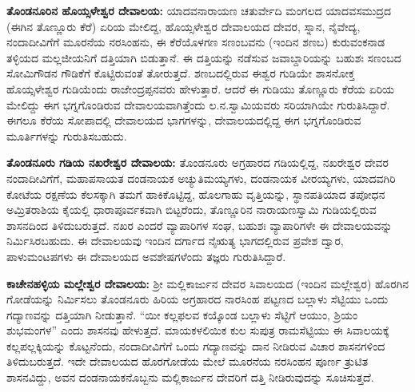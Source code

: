 \textbf{ತೊಂಡನೂರಿನ ಹೊಯ್ಸಳೇಶ್ವರ ದೇವಾಲಯ:} ಯಾದವನಾರಾಯಣ ಚತುರ್ವೇದಿ ಮಂಗಲದ ಯಾದವಸಮುದ್ರದ (ಈಗಿನ ತೊಣ್ಣೂರು ಕೆರೆ) ಏರಿಯ ಮೇಲಿದ್ದ, ಹೊಯ್ಸಳೇಶ್ವರ ದೇವಾಲಯದ ದೇವರ, ಸ್ನಾನ, ನೈವೇದ್ಯ, ನಂದಾದೀವಿಗೆಗೆ ಮೂರನೆಯ ನರಸಿಂಹನು, ಈ ಕೆರೆಯೊಳಗಣ ಸಣಂಬವನು (ಇಂದಿನ ಶಣಬ) ಕುರುವಂಕನಾಡ ತಳ್ಳಿಯದ ಮಲ್ಲಜೀಯನಿಗೆ ದತ್ತಿಯಾಗಿ ಬಿಡುತ್ತಾನೆ. ಈ ದತ್ತಿಯನ್ನು ನಡೆಸುವ ಜವಾಬ್ದಾರಿಯನ್ನು ಬಹುಶಃ ಸಣಂಬದ ಸೋಮಿಗೌಡನ ಗೌಡಿಕೆಗೆ ಕೊಟ್ಟಿರುವಂತೆ ತೋರುತ್ತದೆ. ಶಣಬದಲ್ಲಿರುವ ಈಶ್ವರ ಗುಡಿಯೇ ಶಾಸನೋಕ್ತ ಹೊಯ್ಸಳೇಶ್ವರ ಗುಡಿಯೆಂದು ರಾಜೇಂದ್ರಪ್ಪನವರು ಹೇಳುತ್ತಾರೆ. ಆದರೆ ಈ ಗುಡಿಯು ತೊಣ್ಣೂರು ಕೆರೆಯ ಏರಿಯ ಮೇಲಿದ್ದು ಈಗ ಭಗ್ನಗೊಂಡಿರುವ ದೇವಾಲಯವಾಗಿತ್ತೆಂದು ಲ.ನ.ಸ್ವಾಮಿಯವರು ಸರಿಯಾಗಿಯೇ ಗುರುತಿಸಿದ್ದಾರೆ. ಈಗಲೂ ಕೆರೆಯ ಸೋಪಾದಲ್ಲಿ ದೇವಾಲಯದ ಭಾಗಗಳನ್ನು, ದೇವಾಲಯದಲ್ಲಿದ್ದ ಈಗ ಭಗ್ನಗೊಂಡಿರುವ ಮೂರ್ತಿಗಳನ್ನು ಗುರುತಿಸಬಹುದು.

\textbf{ತೊಂಡನೂರು ಗಡಿಯ ನಖರೇಶ್ವರ ದೇವಾಲಯ:} ತೊಂಡನೂರು ಅಗ್ರಹಾರದ ಗಡಿಯಲ್ಲಿದ್ದ, ನಖರೇಶ್ವರ ದೇವರ ನಂದಾದೀವಿಗೆಗೆ, ಮಹಾಪಸಾಯತ ದಂಡನಾಯಕ ಅಚ್ಯುತಿಮಯ್ಯಗಳು, ದಂಡನಾಯಕ ವೀರಯ್ಯಗಳು, ಯಾದವಗಿರಿ ಕೋಟೆಯ ರಕ್ಷಣೆಯ ಕೆಲಸಕ್ಕಾಗಿ ತಮಗೆ ಹಾಕಿಕೊಟ್ಟಿದ್ದ, ಹೊಲಗಾಹು ವೃತ್ತಿಯನ್ನು, ಸ್ಥಾನಪತಿಯಾದ ತಪೋಧನ ಅಮ್ರಿತರಾಶಿಯ ಕೈಯಲ್ಲಿ ಧಾರಾಪೂರ್ವಕವಾಗಿ ಬಿಟ್ಟರೆಂದು, ತೊಣ್ಣೂರಿನ ನಾರಾಯಣಸ್ವಾಮಿ ಗುಡಿಯಲ್ಲಿರುವ ಶಾಸನದಿಂದ ತಿಳಿದುಬರುತ್ತದೆ. ನಖರ ಎಂದರೆ ವ್ಯಾಪಾರಿಗಳ ಸಂಘ, ಬಹುಶಃ ವ್ಯಾಪಾರಿಗಳೇ ಈ ದೇವಾಲಯವನ್ನು ನಿರ್ಮಿಸಿರಬಹುದು. ಈ ದೇವಾಲಯವು ಇಂದಿನ ದರ್ಗಾದ ನೈಋತ್ಯ ಭಾಗದಲ್ಲಿರುವ ಪ್ರವೇಶ ದ್ವಾರ, ಪಾಳುಮಂಟಪಗಳು ಈ ದೇವಾಲಯದ ಅವಶೇಷಗಳೆಂದು ತಜ್ಞರು ಗುರುತಿಸಿದ್ದಾರೆ.

\textbf{ಕಾಚೇನಹಳ್ಳಿಯ ಮಲ್ಲೇಶ್ವರ ದೇವಾಲಯ:} ಶ‍್ರೀ ಮಲ್ಲಿಕಾರ್ಜುನ ದೇವರ ಸಿವಾಲಯದ (ಇಂದಿನ ಮಲ್ಲೇಶ್ವರ) ಹೊರಗಿನ ಗೋಡೆಯನ್ನು ನಿರ್ಮಿಸಲು ತೊಂಡನೂರು ಹಿರಿಯ ಅಗ್ರಹಾರದ ನಾರಸಿಂಹ ಪಟ್ಟಣದ ಬಲ್ಲಾಳು ಸೆಟ್ಟಿಯು ಒಂದು ಗದ್ಯಾಣವನ್ನು ದತ್ತಿಯಾಗಿ ನೀಡುತ್ತಾನೆ. “ಯೀ ಕಲ್ಲಫಲವ ಕಯ್ಕೊಂಡ ಬಲ್ಲಾಳು ಸೆಟ್ಟಿಗೆ ಆಯುಂ, ಶ್ರಿಯಂ ಶುಭಮಂಗಳ” ಎಂದು ಶಾಸನವು ಹೇಳುತ್ತದೆ. ಮಾಯಕಳಲಿಯಿಕ ಕುಲ ಸುಪುತ್ರ ರಾಮಸೆಟ್ಟಿಯು ಈ ಸಿವಾಲಯಕ್ಕೆ ಕಲ್ಲಪಲ್ಲಕ್ಕಿಯನ್ನು ಕೊಟ್ಟನೆಂದು, ನಂದಾದೀವಿಗೆಗೆ ಒಂದು ಗದ್ಯಾಣವನ್ನು ದಾನ ನೀಡಿರುವ ವಿಚಾರ ಶಾಸನಗಳಿಂದ ತಿಳಿದುಬರುತ್ತದೆ. ಇದೇ ದೇವಾಲಯದ ಹೊರಗೋಡೆಯ ಮೇಲೆ ಮೂರನೆಯ ನರಸಿಂಹನ ಪೂರ್ಣ ತ್ರುಟಿತ ಶಾಸನವಿದ್ದು, ಅವನ ದಂಡನಾಯಕನೊಬ್ಬನು ಮಲ್ಲಿಕಾರ್ಜುನ ದೇವರಿಗೆ ದತ್ತಿ ನೀಡಿರುವುದನ್ನು ಸೂಚಿಸುತ್ತದೆ.

